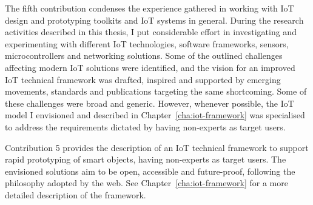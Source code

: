 The fifth contribution condenses the experience gathered in working with IoT design and prototyping toolkits and IoT systems in general. During the research activities described in this thesis, I put considerable effort in investigating and experimenting with different IoT technologies, software frameworks, sensors, microcontrollers and networking solutions. Some of the outlined challenges affecting modern IoT solutions were identified, and the vision for an improved IoT technical framework was drafted, inspired and supported by emerging movements, standards and publications targeting the same shortcoming. Some of these challenges were broad and generic. However, whenever possible, the IoT model I envisioned and described in Chapter~\ref{cha:iot-framework} was specialised to address the requirements dictated by having non-experts as target users.

Contribution 5 provides the description of an IoT technical framework to support rapid prototyping of smart objects, having non-experts as target users. The envisioned solutions aim to be open, accessible and future-proof, following the philosophy adopted by the web. See Chapter~\ref{cha:iot-framework} for a more detailed description of the framework.